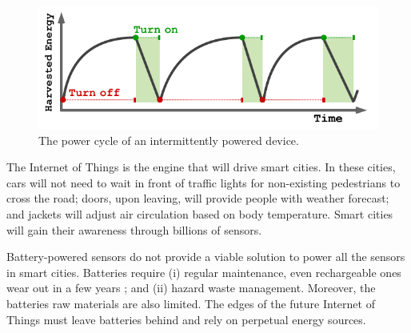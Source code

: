 \begin{figure}
	\centering
		\includegraphics[width=\columnwidth]{figures/PowerCycleIntermittentSystem}
		\caption{The power cycle of an intermittently powered device.}
		\label{fig:powerCycle}
\end{figure}

The Internet of Things is the engine that will drive smart cities. In these cities, cars will not need to wait in front of traffic lights for non-existing pedestrians to cross the road; doors, upon leaving, will provide people with weather forecast; and jackets will adjust air circulation based on body temperature. Smart cities will gain their awareness through billions of sensors.

Battery-powered sensors do not provide a viable solution to power all the sensors in smart cities. Batteries require (i) regular maintenance, even rechargeable ones wear out in a few years \cite{xxx}; and (ii) hazard waste management. Moreover, the batteries raw materials are also limited. The edges of the future Internet of Things must leave batteries behind and rely on perpetual energy sources. 


